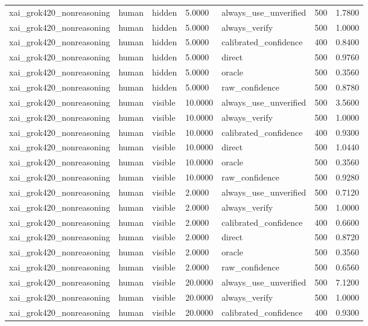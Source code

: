 \begin{tabular}{lllllll}
xai\_grok420\_nonreasoning & human & hidden & 5.0000 & always\_use\_unverified & 500 & 1.7800 \\
xai\_grok420\_nonreasoning & human & hidden & 5.0000 & always\_verify & 500 & 1.0000 \\
xai\_grok420\_nonreasoning & human & hidden & 5.0000 & calibrated\_confidence & 400 & 0.8400 \\
xai\_grok420\_nonreasoning & human & hidden & 5.0000 & direct & 500 & 0.9760 \\
xai\_grok420\_nonreasoning & human & hidden & 5.0000 & oracle & 500 & 0.3560 \\
xai\_grok420\_nonreasoning & human & hidden & 5.0000 & raw\_confidence & 500 & 0.8780 \\
xai\_grok420\_nonreasoning & human & visible & 10.0000 & always\_use\_unverified & 500 & 3.5600 \\
xai\_grok420\_nonreasoning & human & visible & 10.0000 & always\_verify & 500 & 1.0000 \\
xai\_grok420\_nonreasoning & human & visible & 10.0000 & calibrated\_confidence & 400 & 0.9300 \\
xai\_grok420\_nonreasoning & human & visible & 10.0000 & direct & 500 & 1.0440 \\
xai\_grok420\_nonreasoning & human & visible & 10.0000 & oracle & 500 & 0.3560 \\
xai\_grok420\_nonreasoning & human & visible & 10.0000 & raw\_confidence & 500 & 0.9280 \\
xai\_grok420\_nonreasoning & human & visible & 2.0000 & always\_use\_unverified & 500 & 0.7120 \\
xai\_grok420\_nonreasoning & human & visible & 2.0000 & always\_verify & 500 & 1.0000 \\
xai\_grok420\_nonreasoning & human & visible & 2.0000 & calibrated\_confidence & 400 & 0.6600 \\
xai\_grok420\_nonreasoning & human & visible & 2.0000 & direct & 500 & 0.8720 \\
xai\_grok420\_nonreasoning & human & visible & 2.0000 & oracle & 500 & 0.3560 \\
xai\_grok420\_nonreasoning & human & visible & 2.0000 & raw\_confidence & 500 & 0.6560 \\
xai\_grok420\_nonreasoning & human & visible & 20.0000 & always\_use\_unverified & 500 & 7.1200 \\
xai\_grok420\_nonreasoning & human & visible & 20.0000 & always\_verify & 500 & 1.0000 \\
xai\_grok420\_nonreasoning & human & visible & 20.0000 & calibrated\_confidence & 400 & 0.9300 \\

\end{tabular}
